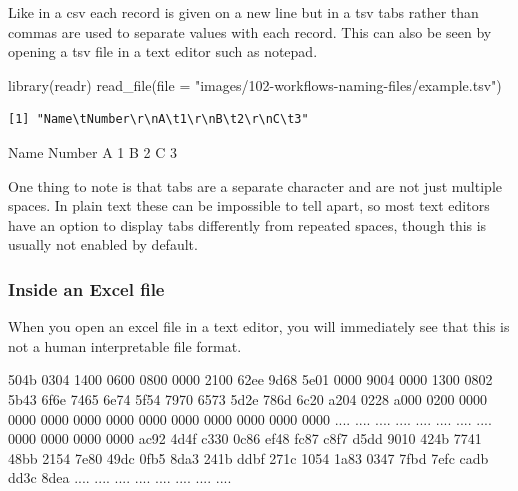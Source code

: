 \documentclass[
  letterpaper,
  DIV=11,
  numbers=noendperiod]{scrreprt}
\newenvironment{Shaded}{\begin{snugshade}}{\end{snugshade}}
\newcommand{\AttributeTok}[1]{\textcolor[rgb]{0.40,0.45,0.13}{#1}}
\newcommand{\FunctionTok}[1]{\textcolor[rgb]{0.28,0.35,0.67}{#1}}
\newcommand{\NormalTok}[1]{\textcolor[rgb]{0.00,0.23,0.31}{#1}}
\newcommand{\StringTok}[1]{\textcolor[rgb]{0.13,0.47,0.30}{#1}}
\begin{document}
Like in a csv each record is given on a new line but in a tsv tabs
rather than commas are used to separate values with each record. This
can also be seen by opening a tsv file in a text editor such as notepad.

\begin{Shaded}
\begin{Highlighting}[]
\FunctionTok{library}\NormalTok{(readr)}
\FunctionTok{read\_file}\NormalTok{(}\AttributeTok{file =} \StringTok{"images/102{-}workflows{-}naming{-}files/example.tsv"}\NormalTok{)}
\end{Highlighting}
\end{Shaded}

\begin{verbatim}
[1] "Name\tNumber\r\nA\t1\r\nB\t2\r\nC\t3"
\end{verbatim}

\begin{Shaded}
\begin{Highlighting}[]
\NormalTok{Name    Number }
\NormalTok{A   1}
\NormalTok{B   2}
\NormalTok{C   3}
\end{Highlighting}
\end{Shaded}

One thing to note is that tabs are a separate character and are not just
multiple spaces. In plain text these can be impossible to tell apart, so
most text editors have an option to display tabs differently from
repeated spaces, though this is usually not enabled by default.

\subsubsection{Inside an Excel file}\label{inside-an-excel-file}

When you open an excel file in a text editor, you will immediately see
that this is not a human interpretable file format.

\begin{Shaded}
\begin{Highlighting}[]
\NormalTok{504b 0304 1400 0600 0800 0000 2100 62ee}
\NormalTok{9d68 5e01 0000 9004 0000 1300 0802 5b43}
\NormalTok{6f6e 7465 6e74 5f54 7970 6573 5d2e 786d}
\NormalTok{6c20 a204 0228 a000 0200 0000 0000 0000}
\NormalTok{0000 0000 0000 0000 0000 0000 0000 0000}
\NormalTok{.... .... .... .... .... .... .... ....}
\NormalTok{0000 0000 0000 0000 ac92 4d4f c330 0c86}
\NormalTok{ef48 fc87 c8f7 d5dd 9010 424b 7741 48bb}
\NormalTok{2154 7e80 49dc 0fb5 8da3 241b ddbf 271c}
\NormalTok{1054 1a83 0347 7fbd 7efc cadb dd3c 8dea}
\NormalTok{.... .... .... .... .... .... .... ....}
\end{Highlighting}
\end{Shaded}
\end{document}
